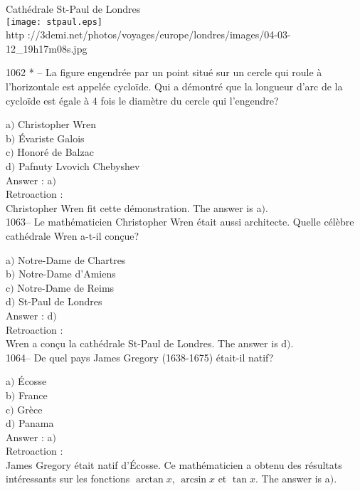﻿\documentclass[letterpaper, 12pt]{article}
\begin{document}
        \begin{center}
        Cath\'edrale St-Paul de Londres\\
    \texttt{[image: stpaul.eps]}\\
        {\footnotesize http
://3demi.net/photos/voyages/europe/londres/images/04-03-12\_19h17m08s.jpg}
    \end{center}

1062 * -- La figure engendr\'ee par un point situ\'e sur un cercle
qui roule \`a l'horizontale est appel\'ee cyclo\"ide. Qui a
d\'emontr\'e que la longueur d'arc de la cyclo\"ide est \'egale \`a
4 fois le diam\`etre du cercle qui l'engendre?

a$)$ Christopher Wren\\
b$)$ \'Evariste Galois \\
c$)$ Honor\'e de Balzac \\
d$)$ Pafnuty Lvovich Chebyshev\\

Answer : a$)$\\

Retroaction : \\
Christopher Wren fit cette d\'emonstration.
The answer is a$)$.\\

1063-- Le math\'ematicien Christopher Wren \'etait aussi architecte.
Quelle c\'el\`ebre cath\'edrale Wren a-t-il con\c cue?

a$)$ Notre-Dame de Chartres  \\
b$)$ Notre-Dame d'Amiens \\
c$)$ Notre-Dame de Reims \\
d$)$ St-Paul de Londres \\

Answer : d$)$\\

Retroaction : \\
Wren a con\c cu la cath\'edrale St-Paul de Londres.
The answer is d$)$.\\

1064-- De quel pays James Gregory (1638-1675) \'etait-il natif?

a$)$ \'Ecosse \\
b$)$ France  \\
c$)$ Gr\`ece  \\
d$)$ Panama \\

Answer : a$)$ \\

Retroaction : \\
James Gregory \'etait natif d'\'Ecosse. Ce math\'ematicien a obtenu
des r\'esultats int\'eressants sur les fonctions $\arctan x$,
$\arcsin x$ et $\tan x$.
The answer is a$)$.\\
\end{document}
